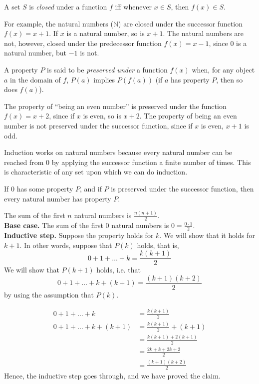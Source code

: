 \documentclass[../../include/open-logic-section]{subfiles}
\begin{document}
\begin{defn}
A set $S$ is \emph{closed} under a function $f$ iff whenever $x \in
S$, then $f(x) \in S$.
\end{defn}

\begin{explain}
For example, the natural numbers ($\mathbb{N}$) are closed under the successor 
function $f(x) = x+1$. If $x$ is a natural number, so is $x+1$. The natural numbers 
are not, however, closed under the predecessor function $f(x) = x-1$, since $0$ is a 
natural number, but $-1$ is not.
\end{explain}

\begin{defn}
A property $P$ is said to be \emph{preserved under} a function $f(x)$ when, for any
object $a$ in the domain of $f$, $P(a)$ implies $P(f(a))$ (if $a$ has property $P$, then 
so does $f(a)$).
\end{defn}

\begin{explain}
The property of ``being an even number'' is preserved under the function $f(x) = x+2$, 
since if $x$ is even, so is $x+2$. The property of being an even number is not preserved 
under the successor function, since if $x$ is even, $x+1$ is odd.

Induction works on natural numbers because every natural number can be 
reached from 0 by applying the successor function a finite number of times. This is 
characteristic of any set upon which we can do induction.
\end{explain}

\begin{defn}
If 0 has some property $P$, and if $P$ is preserved under the successor function, then
every natural number has property $P$.
\end{defn}

\begin{ex} The sum of the first $n$ natural numbers is $\frac{n(n+1)}{2}$. \\

\textbf{Base case.} The sum of the first 0 natural numbers is $0= \frac{0\cdot 1}{2}$.\\

\textbf{Inductive step.} Suppose the property holds for $k$. We will show that it holds 
for $k+1$. In other words, suppose that $P(k)$ holds, that is,
\[ 0 + 1 + \ldots + k = \frac{k(k+1)}{2} \]
We will show that $P(k+1)$ holds, i.e. that
\[ 0 + 1 + \ldots + k + (k+1) = \frac{(k+1)(k+2)}{2} \]
by using the assumption that $P(k)$.

\begin{align*}
0 + 1 + \ldots + k &= \frac{k(k+1)}{2} \tag{Assumption} \\
0 + 1 + \ldots + k + (k+1) &= \frac{k(k+1)}{2} + (k+1) \tag{Add $k+1$ to both sides} \\
&= \frac{k(k+1) + 2(k+1)}{2} \\
&= \frac{2k + k + 2k +2}{2} \\
&=\frac{(k+1)(k+2)}{2}
\end{align*}
Hence, the inductive step goes through, and we have proved the claim.
\end{ex}
\end{document}

